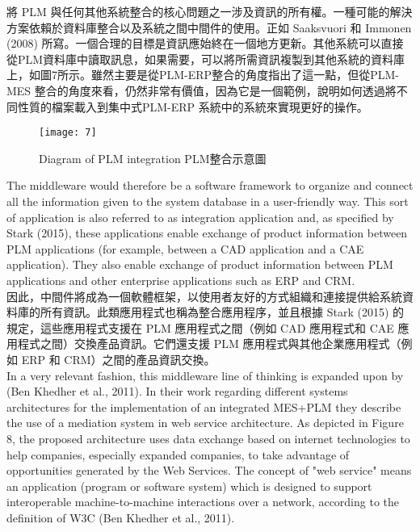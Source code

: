 \fontsize{14pt}{5pt}\sectionef
 {將 PLM 與任何其他系統整合的核心問題之一涉及資訊的所有權。一種可能的解決方案依賴於資料庫整合以及系統之間中間件的使用。正如 Saaksvuori 和 Immonen (2008) 所寫。一個合理的目標是資訊應始終在一個地方更新。其他系統可以直接從PLM資料庫中讀取訊息，如果需要，可以將所需資訊複製到其他系統的資料庫上，如圖7所示。雖然主要是從PLM-ERP整合的角度指出了這一點，但從PLM-MES 整合的角度來看，仍然非常有價值，因為它是一個範例，說明如何透過將不同性質的檔案載入到集中式PLM-ERP 系統中的系統來實現更好的操作。
}\\[15pt]
\newpage
\begin{figure}[hbt!]
\begin{center}
\texttt{[image: 7]}
\caption{\Large Diagram of PLM integration PLM整合示意圖}\label{fig.7}
\end{center}
\end{figure}

\fontsize{14pt}{2.5pt}\sectionef 
{The middleware would therefore be a software framework to organize and connect all the information given to the system database in a user-friendly way. This sort of application is also referred to as integration application and, as specified by Stark (2015), these applications enable exchange of product information between PLM applications (for example, between a CAD application and a CAE application). They also enable exchange of product information between PLM applications and other enterprise applications such as ERP and CRM.}\\[10pt]

\fontsize{14pt}{5pt}\sectionef
 {因此，中間件將成為一個軟體框架，以使用者友好的方式組織和連接提供給系統資料庫的所有資訊。此類應用程式也稱為整合應用程序，並且根據 Stark (2015) 的規定，這些應用程式支援在 PLM 應用程式之間（例如 CAD 應用程式和 CAE 應用程式之間）交換產品資訊。它們還支援 PLM 應用程式與其他企業應用程式（例如 ERP 和 CRM）之間的產品資訊交換。}\\[15pt]

\fontsize{14pt}{2.5pt}\sectionef 
{In a very relevant fashion, this middleware line of thinking is expanded upon by (Ben Khedher et al., 2011). In their work regarding different systems architectures for the implementation of an integrated MES+PLM they describe the use of a mediation system in web service architecture. As depicted in Figure 8, the proposed architecture uses data exchange based on internet technologies to help companies, especially expanded companies, to take advantage of opportunities generated by the Web Services. The concept of "web service" means an application (program or software system) which is designed to support interoperable machine-to-machine interactions over a network, according to the definition of W3C (Ben Khedher et al., 2011).}\\[10pt]

